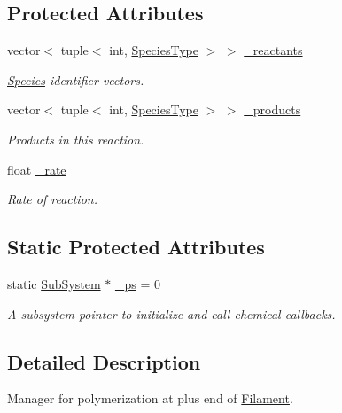 \subsection*{Protected Attributes}
\begin{DoxyCompactItemize}
\item 
vector$<$ tuple$<$ int, \hyperlink{Species_8h_a50651af47c56ea0e27235468d23542cf}{Species\+Type} $>$ $>$ \hyperlink{classInternalFilamentRxnManager_a63de9061c3da4ad03cf4c530d2774979}{\+\_\+reactants}
\begin{DoxyCompactList}\small\item\em \hyperlink{classSpecies}{Species} identifier vectors. \end{DoxyCompactList}\item 
vector$<$ tuple$<$ int, \hyperlink{Species_8h_a50651af47c56ea0e27235468d23542cf}{Species\+Type} $>$ $>$ \hyperlink{classInternalFilamentRxnManager_afd213da1a3706e2e88962e5da886a5dc}{\+\_\+products}
\begin{DoxyCompactList}\small\item\em Products in this reaction. \end{DoxyCompactList}\item 
float \hyperlink{classInternalFilamentRxnManager_a8b98dd9e6f5d016149f5434b891806df}{\+\_\+rate}
\begin{DoxyCompactList}\small\item\em Rate of reaction. \end{DoxyCompactList}\end{DoxyCompactItemize}
\subsection*{Static Protected Attributes}
\begin{DoxyCompactItemize}
\item 
static \hyperlink{classSubSystem}{Sub\+System} $\ast$ \hyperlink{classInternalFilamentRxnManager_a973ce9cc2aae811e6867afa46193c5f2}{\+\_\+ps} = 0
\begin{DoxyCompactList}\small\item\em A subsystem pointer to initialize and call chemical callbacks. \end{DoxyCompactList}\end{DoxyCompactItemize}


\subsection{Detailed Description}
Manager for polymerization at plus end of \hyperlink{classFilament}{Filament}. 

